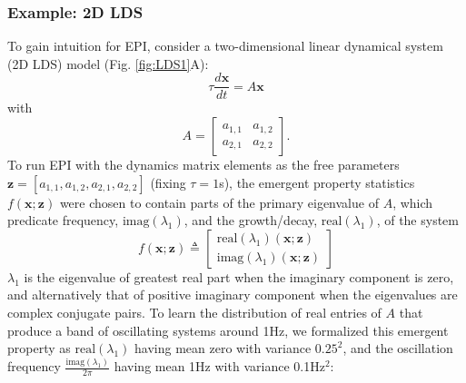 \documentclass[11pt]{article}
\begin{document}
\subsubsection{Example: 2D LDS}\label{methods_2DLDS}
To gain intuition for EPI, consider a two-dimensional linear dynamical system (2D LDS) model (Fig. \ref{fig:LDS1}A):
\begin{equation} 
\tau \frac{d\mathbf{x}}{dt} = A\mathbf{x}
\end{equation}
with
\begin{equation}
A = \begin{bmatrix} a_{1,1} & a_{1,2} \\ a_{2,1} & a_{2,2} \end{bmatrix}.
\end{equation}
To run EPI with the dynamics matrix elements as the free parameters $\mathbf{z} = [ a_{1,1}, a_{1,2}, a_{2,1}, a_{2,2}]$ (fixing $\tau=1$s), the emergent property statistics $f(\mathbf{x}; \mathbf{z})$ were chosen to contain parts of the primary eigenvalue of $A$, which predicate frequency, $\text{imag}(\lambda_1)$, and the growth/decay, $\text{real}(\lambda_1)$, of the system
\begin{equation}
f(\mathbf{x}; \mathbf{z}) \triangleq \begin{bmatrix} \text{real}(\lambda_1)(\mathbf{x}; \mathbf{z}) \\ \text{imag}(\lambda_1)(\mathbf{x}; \mathbf{z}) \end{bmatrix}
\end{equation}
$\lambda_1$ is the eigenvalue of greatest real part when the imaginary component is zero, and alternatively that of positive imaginary component when the eigenvalues are complex conjugate pairs.  
To learn the distribution of real entries of $A$ that produce a band of oscillating systems around 1Hz, we formalized this emergent property as $\text{real}(\lambda_1)$ having mean zero with variance $0.25^2$, and the oscillation frequency $\frac{\text{imag}(\lambda_1)}{2 \pi}$ having mean 1Hz with variance 0.1Hz$^2$:
\end{document}
